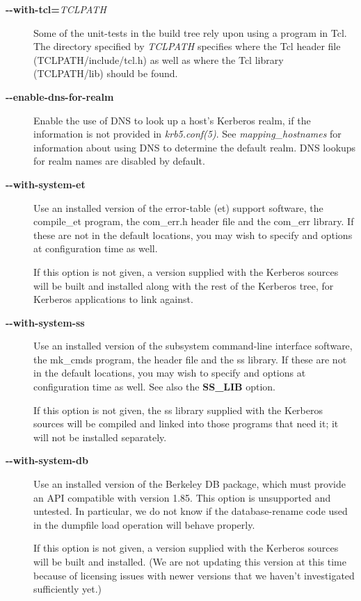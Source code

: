 \documentclass[letterpaper,10pt,english]{sphinxmanual}
\begin{document}
\begin{description}
\item[{\textbf{-}\textbf{-with-tcl=}\emph{TCLPATH}}] \leavevmode
Some of the unit-tests in the build tree rely upon using a program
in Tcl.  The directory specified by \emph{TCLPATH} specifies where the
Tcl header file (TCLPATH/include/tcl.h) as well as where the Tcl
library (TCLPATH/lib) should be found.

\item[{\textbf{-}\textbf{-enable-dns-for-realm}}] \leavevmode
Enable the use of DNS to look up a host's Kerberos realm,
if the information is not provided in
\emph{krb5.conf(5)}.  See \emph{mapping\_hostnames}
for information about using DNS to determine the default realm.
DNS lookups for realm names are disabled by default.

\item[{\textbf{-}\textbf{-with-system-et}}] \leavevmode
Use an installed version of the error-table (et) support software,
the compile\_et program, the com\_err.h header file and the com\_err
library.  If these are not in the default locations, you may wish
to specify  and
 options at configuration time as
well.

If this option is not given, a version supplied with the Kerberos
sources will be built and installed along with the rest of the
Kerberos tree, for Kerberos applications to link against.

\item[{\textbf{-}\textbf{-with-system-ss}}] \leavevmode
Use an installed version of the subsystem command-line interface
software, the mk\_cmds program, the  header file and the
ss library.  If these are not in the default locations, you may
wish to specify  and
 options at configuration time as
well.  See also the \textbf{SS\_LIB} option.

If this option is not given, the ss library supplied with the
Kerberos sources will be compiled and linked into those programs
that need it; it will not be installed separately.

\item[{\textbf{-}\textbf{-with-system-db}}] \leavevmode
Use an installed version of the Berkeley DB package, which must
provide an API compatible with version 1.85.  This option is
unsupported and untested.  In particular, we do not know if the
database-rename code used in the dumpfile load operation will
behave properly.

If this option is not given, a version supplied with the Kerberos
sources will be built and installed.  (We are not updating this
version at this time because of licensing issues with newer
versions that we haven't investigated sufficiently yet.)

\end{description}
\end{document}
